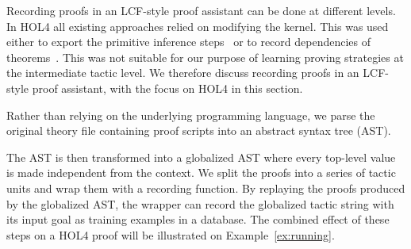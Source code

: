 \documentclass[runningheads,a4paper,draft]{svjour3}
\def\holfour{\textsf{HOL4}\xspace}
\begin{document}
Recording proofs in an LCF-style proof assistant can be done at different 
levels.
In \holfour all existing approaches relied on modifying the kernel. This was 
used
either to export the primitive inference 
steps~\cite{Wong95recordingand,DBLP:conf/itp/KumarH12}
or to record dependencies of theorems~\cite{tgck-cpp15}. This was not suitable 
for our
purpose of learning proving strategies at the intermediate tactic level. We 
therefore
discuss recording proofs in an LCF-style proof assistant, with the focus on 
\holfour
in this section.




Rather than relying on the underlying programming language, we parse the
original theory file containing proof scripts into an
abstract syntax tree (AST).


 The AST is then transformed into a globalized AST
where every top-level value is made independent from
the context.  We 
split the proofs into a series of tactic units and wrap them 
with a recording function.
By replaying the proofs produced by the globalized AST, the wrapper can
record the globalized tactic string with its input goal as training examples in
a database.
The combined effect of these steps on a \holfour proof will be illustrated on 
Example~\ref{ex:running}.
\end{document}
